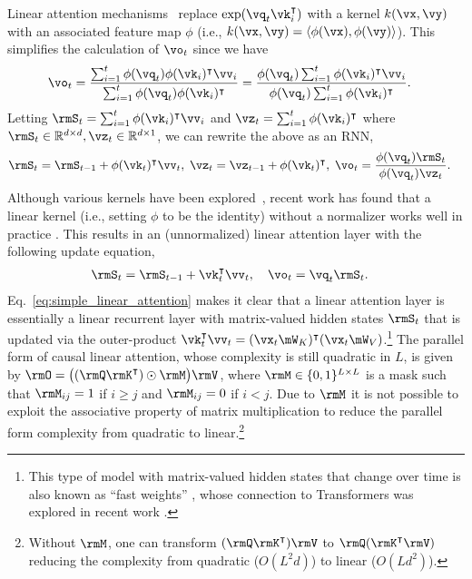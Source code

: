 Linear attention mechanisms~\citep{katharopoulos2020transformers} replace $\exp(\vq_t \vk_i^\intercal)$ with a kernel $k(\vx, \vy)$ with an associated feature map $\phi$ (i.e., $k(\vx, \vy) = \langle\phi(\vx), \phi(\vy)\rangle$).  This simplifies the calculation of $\vo_t$ since we have
\begin{align*}
 \vo_t &= \frac{\sum_{i=1}^{ t}\phi(\vq_t)\phi(\vk_i)^\intercal \vv_i}{\sum_{i=1}^{t} \phi(\vq_t)\phi(\vk_i)^\intercal  }  
 = \frac{\phi(\vq_t)   \sum_{i=1}^{t}\phi(\vk_i)^\intercal \vv_i}{\phi(\vq_t) \sum_{i=1}^{t}\phi(\vk_i)^\intercal}.
\end{align*}
Letting $\rmS_t=\sum_{i=1}^{t}\phi(\vk_i)^\intercal \vv_i$ and $\vz_t=\sum_{i=1}^{t}\phi(\vk_i)^\intercal$ where $\rmS_t \in \mathbb{R}^{d\times d}, \vz_t \in \mathbb{R}^{d\times 1}$, we can rewrite the above as an RNN,
\begin{align*}
\rmS_t = \rmS_{t-1} &+ \phi(\vk_t)^\intercal \vv_t, \hspace{1mm} \vz_t = \vz_{t-1} + \phi(\vk_t)^\intercal, \hspace{1mm} \vo_t = \frac{\phi(\vq_t) \rmS_t}{ \phi(\vq_t) \vz_t}.
\end{align*}
 Although various kernels have been explored~\citep{kasai-etal-2021-finetuning,peng2021random}, recent work has found that a linear kernel (i.e., setting $\phi$ to be the identity) without a normalizer  works well in practice \cite{sun2023retentive}. 
This results in an (unnormalized) linear attention layer with the following update equation,
\begin{align}
& \rmS_t = \rmS_{t-1} + \vk_t^\intercal \vv_t, \quad \vo_t = \vq_t \rmS_t   .
\label{eq:simple_linear_attention}
\end{align}
Eq.~\ref{eq:simple_linear_attention} makes it clear that  a linear attention layer is essentially a linear recurrent layer with matrix-valued hidden states $\rmS_t$ that is updated via the outer-product $\vk_t^\intercal\vv_t = (\vx_t \mW_K)^\intercal (\vx_t \mW_V)$.\footnote{This type of model with matrix-valued hidden states that change over time is also known as ``fast weights'' \citep{hinton1987using,schmidhuber1992learning,ba2016using}, whose connection to Transformers was  explored in recent work \citep{linear-xmr-fastweight,irie2021going,mao-2022-fine}.} 
The parallel form of causal linear attention, whose complexity is still quadratic in $L$, is given by
$\rmO = \big((\rmQ \rmK^\intercal) \odot \rmM \big)\rmV$,
where $\rmM \in \{0,1\}^{L \times L}$ is a mask such that $\rmM_{ij}=1$ if $i\ge j$ and $\rmM_{ij}=0$ if $i<j$. Due to $\rmM$ it is not possible to exploit the associative property of matrix multiplication to reduce the parallel form complexity from quadratic to linear.\footnote{Without $\rmM$, one can transform $(\rmQ \rmK^\intercal)\rmV$ to $\rmQ( \rmK^\intercal\rmV)$ reducing the complexity from quadratic ($O(L^2d)$) to linear ($O(Ld^2)$).}

